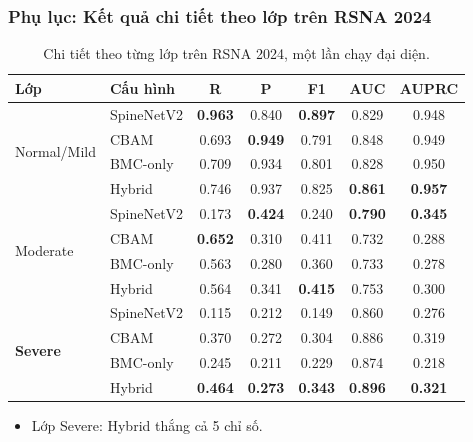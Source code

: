 \documentclass{beamer}
\numberwithin{figure}{section}
\numberwithin{table}{section}
\begin{document}
\begin{frame}
\frametitle{Phụ lục: Kết quả chi tiết theo lớp trên RSNA 2024}
\begin{table}
\centering
\scriptsize
\setlength{\tabcolsep}{4pt}
\renewcommand{\arraystretch}{1.05}
\begin{tabular}{llccccc}
\toprule
\textbf{Lớp} & \textbf{Cấu hình} & R & P & F1 & AUC & AUPRC \\
\midrule
\multirow{4}{*}{Normal/Mild}
 & SpineNetV2 & \textbf{0.963} & 0.840 & \textbf{0.897} & 0.829 & 0.948 \\
 & CBAM       & 0.693 & \textbf{0.949} & 0.791 & 0.848 & 0.949 \\
 & BMC-only   & 0.709 & 0.934 & 0.801 & 0.828 & 0.950 \\
 & Hybrid     & 0.746 & 0.937 & 0.825 & \textbf{0.861} & \textbf{0.957} \\
\midrule
\multirow{4}{*}{Moderate}
 & SpineNetV2 & 0.173 & \textbf{0.424} & 0.240 & \textbf{0.790} & \textbf{0.345} \\
 & CBAM       & \textbf{0.652} & 0.310 & 0.411 & 0.732 & 0.288 \\
 & BMC-only   & 0.563 & 0.280 & 0.360 & 0.733 & 0.278 \\
 & Hybrid     & 0.564 & 0.341 & \textbf{0.415} & 0.753 & 0.300 \\
\midrule
\multirow{4}{*}{\textbf{Severe}}
 & SpineNetV2 & 0.115 & 0.212 & 0.149 & 0.860 & 0.276 \\
 & CBAM       & 0.370 & 0.272 & 0.304 & 0.886 & 0.319 \\
 & BMC-only   & 0.245 & 0.211 & 0.229 & 0.874 & 0.218 \\
 & Hybrid     & \textbf{0.464} & \textbf{0.273} & \textbf{0.343} & \textbf{0.896} & \textbf{0.321} \\
\bottomrule
\end{tabular}
\caption{Chi tiết theo từng lớp trên RSNA 2024, một lần chạy đại diện.}
\end{table}
\begin{itemize}
    \item[$\rightarrow$] Lớp Severe: Hybrid thắng cả 5 chỉ số.
\end{itemize}
\end{frame}
\end{document}
